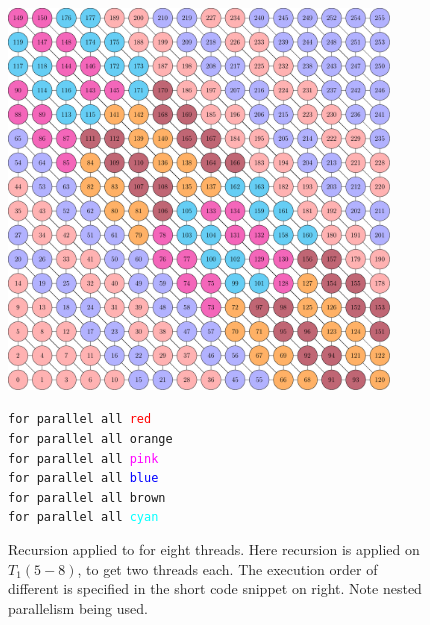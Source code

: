        \begin{figure}[H]
       	\begin{minipage}[c]{0.62\textwidth}
       		\includegraphics[height=0.25\textheight,width=0.9\textwidth]{pics/recursion/2d-7pt_example/2d-7pt/stencil_2d_7pt}
       	\end{minipage}\hfill
       	\begin{minipage}[c]{0.38\textwidth}
       		{\tt for parallel all \textcolor{red}{red}\\
       			\hspace*{1em} for parallel all \textcolor{amber}{orange}\\
       			\hspace*{1em} for parallel all \textcolor{magenta}{pink}\\
       		}
       		{\tt for parallel all \textcolor{blue}{blue}\\
       			\hspace*{1em} for parallel all \textcolor{carmine}{brown}\\
       			\hspace*{1em} for parallel all \textcolor{cyan}{cyan}\\
       		}
       		\caption{Recursion applied to \stex for eight threads. Here recursion is applied on \levelGroups $T_1(5-8)$, to get two threads each. The execution order of different \levelGroup is specified in the short code snippet on right. Note nested parallelism being used.}
       		\label{fig:rec_2d-7pt_graph}
       	\end{minipage}
       \end{figure}
     
